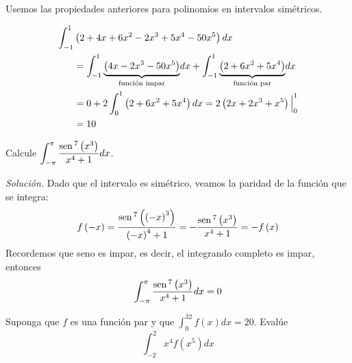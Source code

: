 




\begin{ejemplo} \textnormal{Usemos las propiedades anteriores para polinomios en intervalos simétricos.}
\end{ejemplo}
\begin{align*}
\int_{-1}^{1}&\left( 2+4x+6x^{2}-2x^{3}+5x^{4}-50x^{5}\right) dx\\
&=\int_{-1}^{1}\underset{\text{función impar}}{\underbrace{\left(
4x-2x^{3}-50x^{5}\right) }}dx+\int_{-1}^{1}\underset{\text{función par}}{%
\underbrace{\left( 2+6x^{2}+5x^{4}\right) }}dx\\
&=0+2\int_{0}^{1}\left( 2+6x^{2}+5x^{4}\right) dx
=2\left( 2x+2x^{3}+x^{5}\right)\Big\vert_{0}^{1}\\
&=10
\end{align*}

\begin{ejemplo}
Calcule $\displaystyle{\int_{-\pi }^{\pi }\frac{\text{\rm sen}\,^{7}\left( x^{3}\right) }{x^{4}+1}dx}$.
\end{ejemplo}

\textit{Solución.} Dado que el intervalo es simétrico, veamos la paridad de la función que se integra:
\[
f\left( -x\right) =\frac{\sen ^{7}\left( \left( -x\right) ^{3}\right) }{%
\left( -x\right) ^{4}+1}=-\frac{\sen ^{7}\left( x^{3}\right) }{x^{4}+1}%
=-f\left( x\right)
\]
Recordemos que seno es impar, es decir, el integrando completo es impar, entonces
\[
{\int_{-\pi }^{\pi }\frac{\text{\rm sen}\, ^{7}\left( x^{3}\right) }{x^{4}+1}dx=0}
\]

\begin{ejemplo}
\textnormal{Suponga que \textit{$f$} es una función par y que {\small \textit{$\displaystyle{\int_{0}^{32}f\left( x\right)
dx=20.}$}} Evalúe}
\[
\displaystyle{\int_{-2}^{2}x^{4}f\left( x^{5}\right) dx}
\]
\end{ejemplo}


